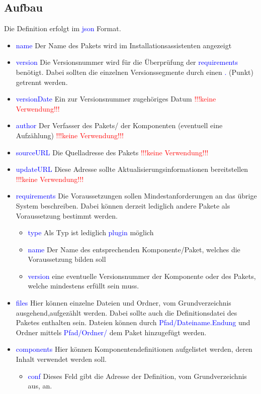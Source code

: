 \documentclass[10pt,a4paper,final,parskip]{scrartcl}
\numberwithin{equation}{section}
\newcommand{\blau}[1]{\textcolor{blue}{#1}}
\newcommand{\nicht}{\textcolor{red}{!!!keine Verwendung!!!}}
\begin{document}
\subsection{Aufbau}
Die Definition erfolgt im \blau{json} Format.
\begin{itemize}
\item \blau{name} Der Name des Pakets wird im Installationsassistenten angezeigt
\item \blau{version} Die Versionsnummer wird für die Überprüfung der \blau{requirements} benötigt. Dabei sollten die einzelnen Versionssegmente durch einen \blau{.} (Punkt) getrennt werden.
\item \blau{versionDate} Ein zur Versionsnummer zugehöriges Datum \nicht
\item \blau{author} Der Verfasser des Pakets/ der Komponenten (eventuell eine Aufzählung) \nicht
\item \blau{sourceURL} Die Quelladresse des Pakets \nicht
\item \blau{updateURL} Diese Adresse sollte Aktualisierungsinformationen bereitstellen \nicht
\item \blau{requirements} Die Voraussetzungen sollen Mindestanforderungen an das übrige System beschreiben. Dabei können derzeit lediglich andere Pakete als Voraussetzung bestimmt werden.
\begin{itemize}
\item \blau{type} Als Typ ist lediglich \blau{plugin} möglich
\item \blau{name} Der Name des entsprechenden Komponente/Paket, welches die Voraussetzung bilden soll
\item \blau{version} eine eventuelle Versionsnummer der Komponente oder des Pakets, welche mindestens erfüllt sein muss.
\end{itemize}
\item \blau{files} Hier können einzelne Dateien und Ordner, vom Grundverzeichnis ausgehend,aufgezählt werden. Dabei sollte auch die Definitionsdatei des Paketes enthalten sein. Dateien können durch \blau{Pfad/Dateiname.Endung} und Ordner mittels \blau{Pfad/Ordner/} dem Paket hinzugefügt werden.
\item \blau{components} Hier können Komponentendefinitionen aufgelistet werden, deren Inhalt verwendet werden soll.
\begin{itemize}
\item \blau{conf} Dieses Feld gibt die Adresse der Definition, vom Grundverzeichnis aus, an.
\end{itemize}
\end{itemize}
\end{document}
